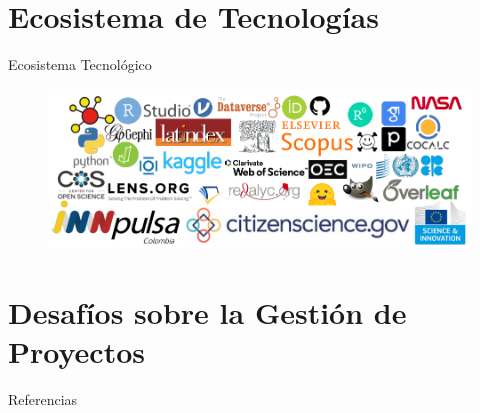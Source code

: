 \documentclass[aspectratio=169]{beamer}
\begin{document}
\section{Ecosistema de Tecnologías}
\begin{frame}
\centering
\Huge
Ecosistema Tecnológico
\end{frame}


\begin{frame}
\begin{figure}
\includegraphics[width=1\textwidth]{Ecosistema.png}
\end{figure}    
\end{frame}


\section{Desafíos sobre la Gestión de Proyectos}



\begin{frame}[allowframebreaks]{Referencias}
\printbibliography[heading=none]
\end{frame}
\end{document}
